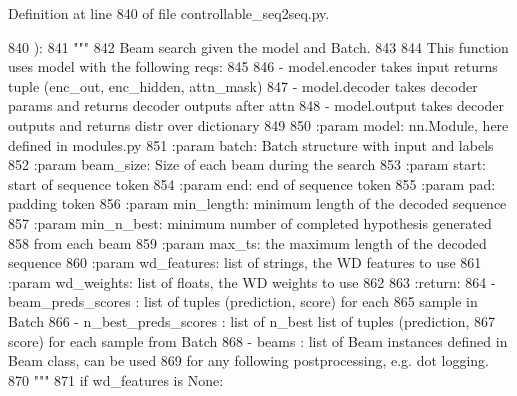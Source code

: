 Definition at line 840 of file controllable\+\_\+seq2seq.\+py.


\begin{DoxyCode}
840     ):
841         \textcolor{stringliteral}{"""}
842 \textcolor{stringliteral}{        Beam search given the model and Batch.}
843 \textcolor{stringliteral}{}
844 \textcolor{stringliteral}{        This function uses model with the following reqs:}
845 \textcolor{stringliteral}{}
846 \textcolor{stringliteral}{        - model.encoder takes input returns tuple (enc\_out, enc\_hidden, attn\_mask)}
847 \textcolor{stringliteral}{        - model.decoder takes decoder params and returns decoder outputs after attn}
848 \textcolor{stringliteral}{        - model.output takes decoder outputs and returns distr over dictionary}
849 \textcolor{stringliteral}{}
850 \textcolor{stringliteral}{        :param model: nn.Module, here defined in modules.py}
851 \textcolor{stringliteral}{        :param batch: Batch structure with input and labels}
852 \textcolor{stringliteral}{        :param beam\_size: Size of each beam during the search}
853 \textcolor{stringliteral}{        :param start: start of sequence token}
854 \textcolor{stringliteral}{        :param end: end of sequence token}
855 \textcolor{stringliteral}{        :param pad: padding token}
856 \textcolor{stringliteral}{        :param min\_length: minimum length of the decoded sequence}
857 \textcolor{stringliteral}{        :param min\_n\_best: minimum number of completed hypothesis generated}
858 \textcolor{stringliteral}{            from each beam}
859 \textcolor{stringliteral}{        :param max\_ts: the maximum length of the decoded sequence}
860 \textcolor{stringliteral}{        :param wd\_features: list of strings, the WD features to use}
861 \textcolor{stringliteral}{        :param wd\_weights: list of floats, the WD weights to use}
862 \textcolor{stringliteral}{}
863 \textcolor{stringliteral}{        :return:}
864 \textcolor{stringliteral}{            - beam\_preds\_scores : list of tuples (prediction, score) for each}
865 \textcolor{stringliteral}{              sample in Batch}
866 \textcolor{stringliteral}{            - n\_best\_preds\_scores : list of n\_best list of tuples (prediction,}
867 \textcolor{stringliteral}{              score) for each sample from Batch}
868 \textcolor{stringliteral}{            - beams : list of Beam instances defined in Beam class, can be used}
869 \textcolor{stringliteral}{              for any following postprocessing, e.g. dot logging.}
870 \textcolor{stringliteral}{        """}
871         \textcolor{keywordflow}{if} wd\_features \textcolor{keywordflow}{is} \textcolor{keywordtype}{None}:

\end{DoxyCode}
